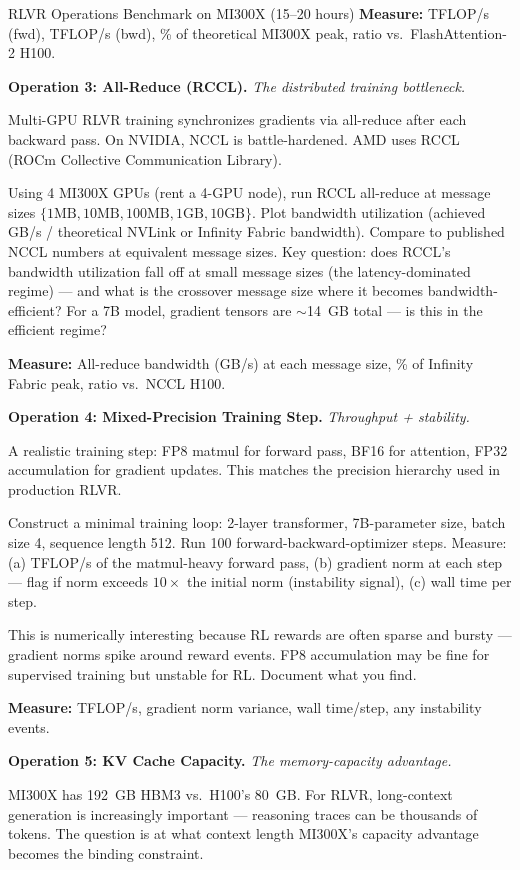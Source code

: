 \begin{exercise}{RLVR Operations Benchmark on MI300X (15--20 hours)}
\textbf{Measure:} TFLOP/s (fwd), TFLOP/s (bwd), \% of theoretical MI300X peak, ratio vs.\ FlashAttention-2 H100.

\medskip
\textbf{Operation 3: All-Reduce (RCCL).} \textit{The distributed training bottleneck.}

Multi-GPU RLVR training synchronizes gradients via all-reduce after each backward pass. On NVIDIA, NCCL is battle-hardened. AMD uses RCCL (ROCm Collective Communication Library).

Using 4 MI300X GPUs (rent a 4-GPU node), run RCCL all-reduce at message sizes $\{1\text{MB}, 10\text{MB}, 100\text{MB}, 1\text{GB}, 10\text{GB}\}$. Plot bandwidth utilization (achieved GB/s / theoretical NVLink or Infinity Fabric bandwidth). Compare to published NCCL numbers at equivalent message sizes. Key question: does RCCL's bandwidth utilization fall off at small message sizes (the latency-dominated regime) --- and what is the crossover message size where it becomes bandwidth-efficient? For a 7B model, gradient tensors are $\sim$14~GB total --- is this in the efficient regime?

\textbf{Measure:} All-reduce bandwidth (GB/s) at each message size, \% of Infinity Fabric peak, ratio vs.\ NCCL H100.

\medskip
\textbf{Operation 4: Mixed-Precision Training Step.} \textit{Throughput + stability.}

A realistic training step: FP8 matmul for forward pass, BF16 for attention, FP32 accumulation for gradient updates. This matches the precision hierarchy used in production RLVR.

Construct a minimal training loop: 2-layer transformer, 7B-parameter size, batch size 4, sequence length 512. Run 100 forward-backward-optimizer steps. Measure: (a) TFLOP/s of the matmul-heavy forward pass, (b) gradient norm at each step --- flag if norm exceeds $10\times$ the initial norm (instability signal), (c) wall time per step.

This is numerically interesting because RL rewards are often sparse and bursty --- gradient norms spike around reward events. FP8 accumulation may be fine for supervised training but unstable for RL. Document what you find.

\textbf{Measure:} TFLOP/s, gradient norm variance, wall time/step, any instability events.

\medskip
\textbf{Operation 5: KV Cache Capacity.} \textit{The memory-capacity advantage.}

MI300X has 192~GB HBM3 vs.\ H100's 80~GB. For RLVR, long-context generation is increasingly important --- reasoning traces can be thousands of tokens. The question is at what context length MI300X's capacity advantage becomes the binding constraint.


\end{exercise}
